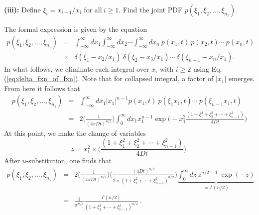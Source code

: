 \textbf{(iii):} Define $\xi_i = x_{i+1}/x_1~\text{for all}~i\geq 1$. Find the joint PDF $p(\xi_1, \xi_2, \ldots, \xi_{n_1})$.

The formal expression is given by the equation
\begin{eqnarray}
p(\xi_1, \xi_2, \ldots, \xi_{n_1}) &=& \int_{-\infty}^{\infty} dx_1 \int_{-\infty}^{\infty} dx_2 \cdots \int_{-\infty}^{\infty} dx_n~p(x_1, t)~p(x_2, t) \cdots ~ p(x_n, t) \nonumber \\
&\times&  \delta(\xi_1 - x_2/x_1)~\delta(\xi_2 - x_3/x_1)\cdots ~\delta(\xi_{n-1} - x_n/x_1).
\end{eqnarray}
In what follows, we eliminate each integral over $x_i$ with $i\geq 2$ using Eq. (\ref{eq:delta_fxn_of_fxn}). Note that for collapsed integral, a factor of $|x_1|$ emerges. From here it follows that
\begin{eqnarray}
p(\xi_1, \xi_2, \ldots, \xi_{n_1}) &=& \int_{-\infty}^{\infty} dx_1 |x_1|^{n-1} p(x_1, t)~p(\xi_1 x_1, t) \cdots ~ p(\xi_{n-1} x_1, t) \nonumber \\
&=& 2 \bigg(\frac{1}{(4 \pi D t)^{n/2}}\bigg) \int_{0}^{\infty} dx_1 x_1^{n-1} \exp\bigg( -x_1^2 \frac{(1+\xi_1^2 + \xi_2^2 + \cdots + \xi_{n-1}^2)}{4Dt}\bigg) \nonumber
\end{eqnarray}
At this point, we make the change of variables
\begin{equation}
z = x_1^2 \times \bigg(\frac{(1+\xi_1^2 + \xi_2^2 + \cdots + \xi_{n-1}^2)}{4Dt}\bigg).
\end{equation}
After $u$-substitution, one finds that
\begin{eqnarray}
p(\xi_1, \xi_2, \ldots, \xi_{n_1}) &=& 2 \bigg(\frac{1}{(4 \pi D t)^{n/2}} \bigg) \bigg( \frac{(4 D t)^{n/2}}{2\times(1+\xi_1^2 +\cdots + \xi_{n-1}^2)^{n/2}} \bigg) \underbrace{\int_{0}^{\infty} dz~z^{n/2-1}~\exp(-z)}_{=\Gamma(n/2)} \nonumber \\
&=&  \boxed{\frac{1}{\pi^{n/2}} \frac{\Gamma(n/2)}{(1+\xi_1^2 +\cdots + \xi_{n-1}^2)^{n/2}}}~.  \nonumber
\end{eqnarray}


